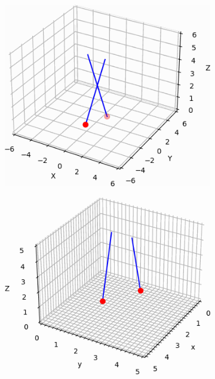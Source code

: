 \documentclass[12pt]{article}
\begin{document}
\begin{multicols}{2}
\begin{figure}[H]
\begin{subfigure}{0.32\linewidth}
        \caption{}
    \end{subfigure}
    \begin{subfigure}{0.32\linewidth}
        \centering
        \includegraphics[width=0.98\linewidth]{figs/fig2/c_cropped.png}
        \caption{}
    \end{subfigure}
    \begin{subfigure}{0.32\linewidth}
        \centering
        \includegraphics[width=0.98\linewidth]{figs/fig2/d_cropped.png}
        \caption{}

\end{subfigure}
\end{figure}
\end{multicols}
\end{document}
